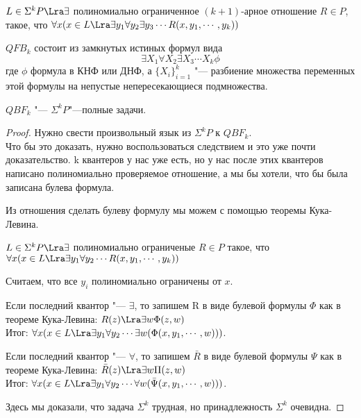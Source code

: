 \begin{conseq}
	$L \in \Sigma^k P \Lra \exists$ полиномиально ограниченное $(k + 1)$-арное
	отношение $R \in P$, такое, что $\forall x(x \in L \Lra \exists y_1 \forall y_2 \exists y_3 \cdots R(x, y_1, \cdots, y_k))$\\
\end{conseq}


\begin{Def}
	$QFB_k$ состоит из замкнутых истиных формул вида
	$$\exists X_1 \forall X_2 \exists X_3 \cdots X_k \phi$$
	где $\phi$ формула в КНФ или ДНФ, а $\{X_i\}_{i = 1}^{k}$ "---
	разбиение множества переменных этой формулы на непустые непересекающиеся подмножества. 
\end{Def}

\begin{theorem}
	$QBF_k$ "--- $\Sigma^kP$"---полные задачи. 
\end{theorem}

\begin{proof}
	Нужно свести произвольный язык из $\Sigma^{k}P$ к $QBF_k$.\\ 
	
	Что бы это доказать, нужно воспользоваться следствием и это 
	уже почти доказательство. k квантеров у нас уже есть, но у нас после этих квантеров написано полиномиально проверяемое 
	отношение, а мы бы хотели, что бы была записана булева формула.

	Из отношения сделать булеву формулу мы можем с помощью теоремы Кука-Левина. 

	$L \in \Sigma^{k}P \Lra \exists$ полиномиально ограниченые $R \in P$
	такое, что $\forall x(x \in L \Lra  \exists y_1 \forall y_2 \cdots R(x, y_1, \cdots, y_k))$
	
	Считаем, что все $y_i$ полиномиально ограничены от $x$.

	Если последний квантор "--- $\exists$, то запишем R в виде булевой формулы 
	$\Phi$ как в теореме Кука-Левина: $R(z) \Lra \exists w \Phi(z, w)$\\

	Итог: $\forall x(x \in L \Lra \exists y_1 \forall y_2 \cdots \exists w(\Phi(x, y_1, \cdots, w)))$.

	Если последний квантор "--- $\forall$, то запишем $\bar R$ в виде булевой формулы 
	$\Psi$ как в теореме Кука-Левина: $\bar R(z) \Lra \exists w \Pi(z,w)$\\
	Итог: $\forall x(x \in L \Lra \exists y_1 \forall y_2 \cdots \forall w(\bar{\Psi}(x, y_1, \cdots, w)))$.

	Здесь мы доказали, что задача $\Sigma^k$ трудная, но принадлежность $\Sigma^k$ очевидна. 
\end{proof}

